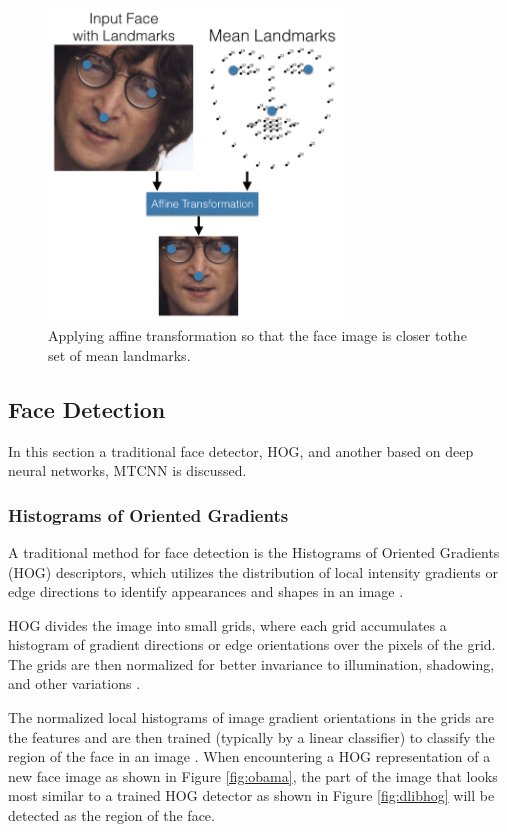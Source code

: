 \documentclass[12pt,english]{article}
\begin{document}
\begin{figure}[!tbp]
 \centering
    \includegraphics[width=0.7\textwidth]{figures/openface_detection.png}
    \caption{Applying affine transformation so that the face image is closer tothe set of mean landmarks. \cite{amos}}
	\label{fig:meanlandmark}
\end{figure}

\subsection{Face Detection}
\quad
In this section a traditional face detector, HOG, and another based on deep neural networks, MTCNN is discussed.

\subsubsection{Histograms of Oriented Gradients}
\quad
A traditional method for face detection is the Histograms of Oriented Gradients (HOG) descriptors, which utilizes the distribution of local intensity gradients or edge directions to identify appearances and shapes in an image \cite{dalal}. 

HOG divides the image into small grids, where each grid accumulates a histogram of gradient directions or edge orientations over the pixels of the grid. The grids are then normalized for better invariance to illumination, shadowing, and other variations \cite{dalal}. 

The normalized local histograms of image gradient orientations in the grids are the features and are then trained (typically by a linear classifier) to classify the region of the face in an image \cite{dalal}. When encountering a HOG representation of a new face image as shown in Figure \ref{fig:obama}, the part of the image that looks most similar to a trained HOG detector as shown in Figure \ref{fig:dlibhog} will be detected as the region of the face. 
\end{document}
